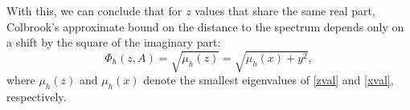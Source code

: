
With this, we can conclude that for $z$ values that share the same real part, Colbrook's approximate bound on the distance to the spectrum depends only on a shift by the square of the imaginary part:
\begin{equation} \label{shift}
    \Phi_h(z, A) = \sqrt{\mu_h(z)} = \sqrt{\mu_h(x) + y^2},
\end{equation}
where $\mu_h(z)$ and $\mu_h(x)$ denote the smallest eigenvalues of \eqref{zval} and \eqref{xval}, respectively.


